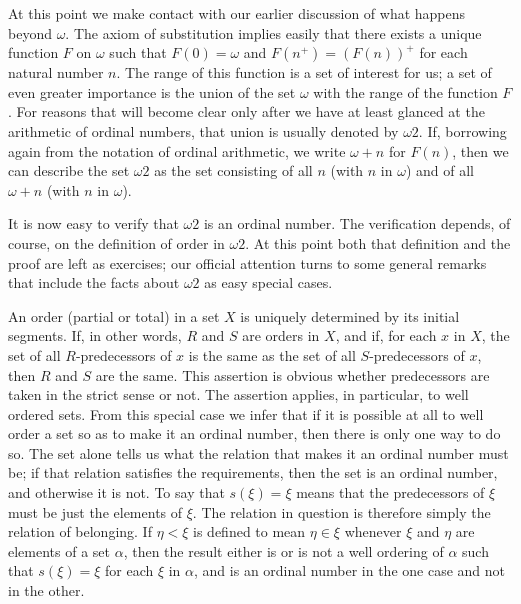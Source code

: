 At this point we make contact with our earlier discussion of what happens beyond $\omega$. The axiom of substitution implies easily that there exists a unique function $F$ on $\omega$ such that $F(0) = \omega$ and $F(n^{+}) = (F(n))^{+}$ for each natural number $n$. The range of this function is a set of interest for us; a set of even greater importance is the union of the set $\omega$ with the range of the function $F$. For reasons that will become clear only after we have at least glanced at the arithmetic of ordinal numbers, that union is usually denoted by $\omega 2$. If, borrowing again from the notation of ordinal arithmetic, we write $\omega + n$ for $F(n)$, then we can describe the set $\omega 2$ as the set consisting of all $n$ (with $n$ in $\omega$) and of all $\omega + n$ (with $n$ in $\omega$). 

It is now easy to verify that $\omega 2$ is an ordinal number. The verification depends, of course, on the definition of order in $\omega 2$. At this point both that definition and the proof are left as exercises; our official attention turns to some general remarks that include the facts about $\omega 2$ as easy special cases. 

An order (partial or total) in a set $X$ is uniquely determined by its initial segments. If, in other words, $R$ and $S$ are orders in $X$, and if, for each $x$ in $X$, the set of all $R$-predecessors of $x$ is the same as the set of all $S$-predecessors of $x$, then $R$ and $S$ are the same. This assertion is   obvious whether predecessors are taken in the strict sense or not. The assertion applies, in particular, to well ordered sets. From this special case we infer that if it is possible at all to well order a set so as to make it an ordinal number, then there is only one way to do so. The set alone tells us what the relation that makes it an ordinal number must be; if that relation satisfies the requirements, then the set is an ordinal number, and otherwise it is not. To say that $s( \xi ) = \xi $ means that the predecessors of $\xi$ must be just the elements of $\xi$. The relation in question is therefore simply the relation of belonging. If $\eta <  \xi$ is defined to mean $\eta \in \xi$ whenever $\xi$ and $\eta$ are elements of a set $\alpha$, then the result either is or is not a well ordering of $\alpha$ such that $s( \xi ) = \xi$ for each $\xi$ in $\alpha$, and is an ordinal number in the one case and not in the other.

